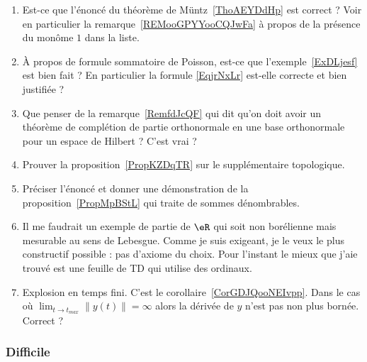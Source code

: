 \begin{enumerate}
    \item
        Est-ce que l'énoncé du théorème de Müntz~\ref{ThoAEYDdHp} est correct ? Voir en particulier la remarque~\ref{REMooGPYYooCQJwFa} à propos de la présence du monôme  \( 1\) dans la liste.
    \item
        À propos de formule sommatoire de Poisson, est-ce que l'exemple~\ref{ExDLjesf} est bien fait ? En particulier la formule \eqref{EqjrNxLr} est-elle correcte et bien justifiée ?
    \item
        Que penser de la remarque~\ref{RemfdJcQF} qui dit qu'on doit avoir un théorème de complétion de partie orthonormale en une base orthonormale pour un espace de Hilbert ? C'est vrai ?
    \item
        Prouver la proposition~\ref{PropKZDqTR} sur le supplémentaire topologique.
    \item
        Préciser l'énoncé et donner une démonstration de la proposition~\ref{PropMpBStL} qui traite de sommes dénombrables.
    \item
        Il me faudrait un exemple de partie de \( \eR\) qui soit non borélienne mais mesurable au sens de Lebesgue. Comme je suis exigeant, je le veux le plus constructif possible : pas d'axiome du choix. Pour l'instant le mieux que j'aie trouvé est une feuille de TD\cite{XSHoosgoQa} qui utilise des ordinaux.
    \item
        Explosion en temps fini. C'est le corollaire~\ref{CorGDJQooNEIvpp}. Dans le cas où \( \lim_{t\to t_{max}} \| y(t) \|=\infty\) alors la dérivée de \( y\) n'est pas non plus bornée. Correct ?
\end{enumerate}

\subsubsection{Difficile}


